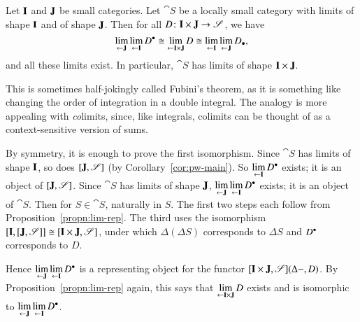 \begin{propn} 
\label{propn:lims-lims}
%
% 
Let $\mathbf{I}$ and $\mathbf{J}$ be small categories.  Let $\cat{S}$ be a
locally small category with limits of shape $\mathbf{I}$ and of shape
$\mathbf{J}$.  Then for all $D\from \scat{I} \times \scat{J} \to \cat{S}$, we
have 
\[
\lim\limits_{\leftarrow \mathbf{J}} \lim\limits_{\leftarrow \mathbf{I}} D^\bullet
\cong
\lim\limits_{\leftarrow \mathbf{I} \times \mathbf{J}} D
\cong 
\lim\limits_{\leftarrow \mathbf{I}} \lim\limits_{\leftarrow \mathbf{J}} D_\bullet,
\]
and all these limits exist.  In particular, $\cat{S}$ has limits of shape
$\mathbf{I} \times \mathbf{J}$.  
\end{propn}
% 
This is sometimes half-jokingly called Fubini's%
%
%
theorem, as it is something like changing the order of integration in a
double integral.  The analogy is more appealing with \emph{co}limits,%
%
%
since, like integrals, colimits can be thought of as a context-sensitive
version of sums.

\begin{pf}
By symmetry, it is enough to prove the first isomorphism.  Since $\cat{S}$
has limits of shape $\mathbf{I}$, so does $[\mathbf{J},\mathscr{S}]$ (by
Corollary~\ref{cor:pw-main}).  So $\lim\limits_{\leftarrow \mathbf{I}} D^\bullet$ exists; it is an
object of $[\mathbf{J},\mathscr{S}]$.  Since $\cat{S}$ has limits of
shape $\mathbf{J}$, $\lim\limits_{\leftarrow \mathbf{J}} \lim\limits_{\leftarrow \mathbf{I}} D^\bullet$ exists; it is an
object of $\cat{S}$.  Then for $S \in \cat{S}$,
% 
% 
naturally in $S$.  The first two steps each follow from
Proposition~\ref{propn:lim-rep}.  The third uses the isomorphism
$[\mathbf{I},[\mathbf{J},\mathscr{S}]] \cong [\mathbf{I} \times
\mathbf{J},\mathscr{S}]$, under which $\Delta(\Delta S)$ corresponds to $\Delta S$
and $D^\bullet$ corresponds to $D$.

Hence $\lim\limits_{\leftarrow \mathbf{J}} \lim\limits_{\leftarrow \mathbf{I}} D^\bullet$ is
a representing object for the functor $[\mathbf{I} \times
\mathbf{J},\mathscr{S}](\Delta-, D)$.  By Proposition~\ref{propn:lim-rep}
again, this says that $\lim\limits_{\leftarrow \mathbf{I} \times \mathbf{J}} D$ exists and is
isomorphic to $\lim\limits_{\leftarrow \mathbf{J}} \lim\limits_{\leftarrow \mathbf{I}} D^\bullet$.
\end{pf}

